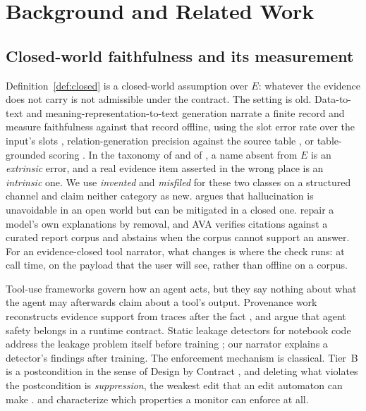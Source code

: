 \documentclass[10pt,twocolumn]{article}
\begin{document}
\section{Background and Related Work}\label{sec:related}

\subsection{Closed-world faithfulness and its measurement}

Definition~\ref{def:closed} is a closed-world assumption \citep{reiter1978closed}
over $E$: whatever the evidence does not carry is not admissible under the
contract. The setting is old. Data-to-text and
meaning-representation-to-text generation narrate a finite record and measure
faithfulness against that record offline, using the slot error rate over the
input's slots \citep{dusek2020e2e}, relation-generation precision against the
source table \citep{wiseman2017challenges}, or table-grounded
scoring \citep{dhingra2019parent}. In the taxonomy of \citet{ji} and of \citet{maynez2020faithfulness}, a
name absent from $E$ is an \emph{extrinsic} error, and a real evidence item
asserted in the wrong place is an \emph{intrinsic} one. We use
\emph{invented} and \emph{misfiled} for these two classes on a structured
channel and claim neither category as new. \citet{xu2025openworld} argues
that hallucination is unavoidable in an open world but can be mitigated in a
closed one. \citet{luo2026removal} repair a model's own
explanations by removal, and AVA \citep{karnatak2026ava} verifies citations
against a curated report corpus and abstains when the corpus cannot support an
answer. For an evidence-closed tool narrator, what changes is where the check
runs: at call time, on the payload that the user will see, rather than offline
on a corpus.

Tool-use frameworks \citep{react,toolformer,mcp} govern how an agent acts, but
they say nothing about what the agent may afterwards claim about a tool's
output. Provenance work reconstructs evidence support from traces after the
fact \citep{wang2026agenttraces}, and \citet{ng2026runtimecontract} argue that agent safety belongs in a runtime
contract. Static leakage detectors for notebook code address the leakage
problem itself before training \citep{yang2022leakage,truong2025leakagedetector};
our narrator explains a detector's findings after training. The enforcement
mechanism is classical. Tier~B is a postcondition in the sense of Design by
Contract \citep{meyer1992dbc}, and deleting what violates the postcondition is
\emph{suppression}, the weakest edit that an edit automaton can
make \citep{ligatti2005edit}. \citet{schneider2000enforceable} and
\citet{falcone2012verify} characterize which properties a
monitor can enforce at all.
\end{document}
